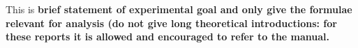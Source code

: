 
This is \textbf{brief statement of experimental goal and only give the formulae relevant for analysis (do not give long theoretical introductions: for these reports it is allowed and encouraged to refer to the manual.}
